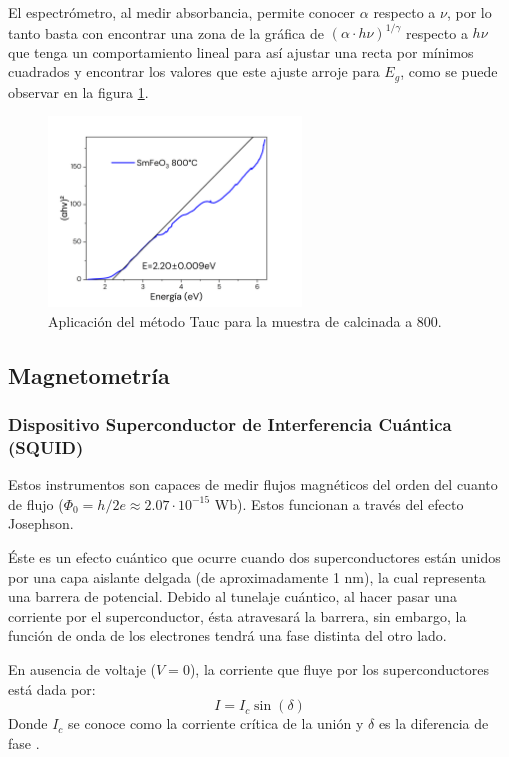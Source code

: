 \documentclass[../main.tex]{subfiles}
\begin{document}
El espectrómetro, al medir absorbancia, permite conocer $\alpha$ respecto a $\nu$, por lo tanto basta con encontrar una zona de la gráfica de $(\alpha\cdot h\nu)^{1/\gamma}$ respecto a $h\nu$ que tenga un comportamiento lineal para así ajustar una recta por mínimos cuadrados y encontrar los valores que este ajuste arroje para $E_g$, como se puede observar en la figura \ref{fig:ejemplotauc}.
\begin{figure}[H]
    \centering
    \includegraphics[width=0.6\textwidth]{fig/ejemplotauc.png}
    \caption{Aplicación del método Tauc para la muestra de \sama{} calcinada a 800\gradoC.}
    \label{fig:ejemplotauc}
\end{figure}
\subsection{Magnetometría}

\subsubsection{Dispositivo Superconductor de Interferencia Cuántica (SQUID)}
Estos instrumentos son capaces de medir flujos magnéticos del orden del cuanto de flujo ($\Phi_0=h/2e\approx2.07\cdot10^{-15}$ Wb). Estos funcionan a través del efecto Josephson.

Éste es un efecto cuántico que ocurre cuando dos superconductores están unidos por una capa aislante delgada (de aproximadamente 1 nm), la cual representa una barrera de potencial. Debido al tunelaje cuántico, al hacer pasar una corriente por el superconductor, ésta atravesará la barrera, sin embargo, la función de onda de los electrones tendrá una fase distinta del otro lado.

En ausencia de voltaje ($V=0$), la corriente que fluye por los superconductores está dada por:
\begin{equation}
    I=I_c\sin(\delta)
    \label{eq:corrientecritica}
\end{equation}
Donde $I_c$ se conoce como la corriente crítica de la unión y $\delta$ es la diferencia de fase \cite{Kirtley1999}.
\end{document}
